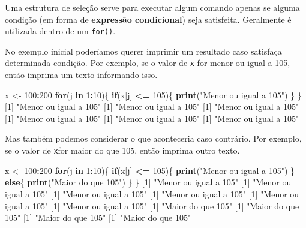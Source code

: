 \documentclass[10pt,a4paper]{book}
\newenvironment{Shaded}{\begin{snugshade}}{\end{snugshade}}
\newcommand{\KeywordTok}[1]{\textcolor[rgb]{0.13,0.29,0.53}{\textbf{#1}}}
\newcommand{\DecValTok}[1]{\textcolor[rgb]{0.00,0.00,0.81}{#1}}
\newcommand{\StringTok}[1]{\textcolor[rgb]{0.31,0.60,0.02}{#1}}
\newcommand{\ControlFlowTok}[1]{\textcolor[rgb]{0.13,0.29,0.53}{\textbf{#1}}}
\newcommand{\OperatorTok}[1]{\textcolor[rgb]{0.81,0.36,0.00}{\textbf{#1}}}
\newcommand{\NormalTok}[1]{#1}
\begin{document}
Uma estrutura de seleção serve para executar algum comando apenas se
alguma condição (em forma de \textbf{expressão condicional}) seja
satisfeita. Geralmente é utilizada dentro de um \texttt{for()}.

No exemplo inicial poderíamos querer imprimir um resultado caso
satisfaça determinada condição. Por exemplo, se o valor de \texttt{x}
for menor ou igual a 105, então imprima um texto informando isso.

\begin{Shaded}
\begin{Highlighting}[]
\NormalTok{x <-}\StringTok{ }\DecValTok{100}\OperatorTok{:}\DecValTok{200}
\ControlFlowTok{for}\NormalTok{(j }\ControlFlowTok{in} \DecValTok{1}\OperatorTok{:}\DecValTok{10}\NormalTok{)\{}
    \ControlFlowTok{if}\NormalTok{(x[j] }\OperatorTok{<=}\StringTok{ }\DecValTok{105}\NormalTok{)\{}
        \KeywordTok{print}\NormalTok{(}\StringTok{"Menor ou igual a 105"}\NormalTok{)}
\NormalTok{    \}}
\NormalTok{\}}
\NormalTok{[}\DecValTok{1}\NormalTok{] }\StringTok{"Menor ou igual a 105"}
\NormalTok{[}\DecValTok{1}\NormalTok{] }\StringTok{"Menor ou igual a 105"}
\NormalTok{[}\DecValTok{1}\NormalTok{] }\StringTok{"Menor ou igual a 105"}
\NormalTok{[}\DecValTok{1}\NormalTok{] }\StringTok{"Menor ou igual a 105"}
\NormalTok{[}\DecValTok{1}\NormalTok{] }\StringTok{"Menor ou igual a 105"}
\NormalTok{[}\DecValTok{1}\NormalTok{] }\StringTok{"Menor ou igual a 105"}
\end{Highlighting}
\end{Shaded}

Mas também podemos considerar o que aconteceria caso contrário. Por
exemplo, se o valor de \texttt{x}for maior do que 105, então imprima
outro texto.

\begin{Shaded}
\begin{Highlighting}[]
\NormalTok{x <-}\StringTok{ }\DecValTok{100}\OperatorTok{:}\DecValTok{200}
\ControlFlowTok{for}\NormalTok{(j }\ControlFlowTok{in} \DecValTok{1}\OperatorTok{:}\DecValTok{10}\NormalTok{)\{}
    \ControlFlowTok{if}\NormalTok{(x[j] }\OperatorTok{<=}\StringTok{ }\DecValTok{105}\NormalTok{)\{}
        \KeywordTok{print}\NormalTok{(}\StringTok{"Menor ou igual a 105"}\NormalTok{)}
\NormalTok{    \} }\ControlFlowTok{else}\NormalTok{\{}
        \KeywordTok{print}\NormalTok{(}\StringTok{"Maior do que 105"}\NormalTok{)}
\NormalTok{    \}}
\NormalTok{\}}
\NormalTok{[}\DecValTok{1}\NormalTok{] }\StringTok{"Menor ou igual a 105"}
\NormalTok{[}\DecValTok{1}\NormalTok{] }\StringTok{"Menor ou igual a 105"}
\NormalTok{[}\DecValTok{1}\NormalTok{] }\StringTok{"Menor ou igual a 105"}
\NormalTok{[}\DecValTok{1}\NormalTok{] }\StringTok{"Menor ou igual a 105"}
\NormalTok{[}\DecValTok{1}\NormalTok{] }\StringTok{"Menor ou igual a 105"}
\NormalTok{[}\DecValTok{1}\NormalTok{] }\StringTok{"Menor ou igual a 105"}
\NormalTok{[}\DecValTok{1}\NormalTok{] }\StringTok{"Maior do que 105"}
\NormalTok{[}\DecValTok{1}\NormalTok{] }\StringTok{"Maior do que 105"}
\NormalTok{[}\DecValTok{1}\NormalTok{] }\StringTok{"Maior do que 105"}
\NormalTok{[}\DecValTok{1}\NormalTok{] }\StringTok{"Maior do que 105"}
\end{Highlighting}
\end{Shaded}
\end{document}
